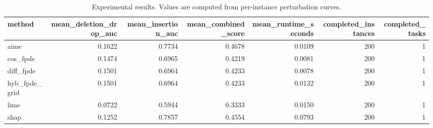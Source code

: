 \begin{table}[t]
\caption{Experimental results. Values are computed from per-instance perturbation curves.}
\label{tab:main_results_computed}
\centering
\begin{tabular}{lrrrrrr}
\toprule
method & mean\_deletion\_drop\_auc & mean\_insertion\_auc & mean\_combined\_score & mean\_runtime\_seconds & completed\_instances & completed\_tasks \\
\midrule
aime & 0.1622 & 0.7734 & 0.4678 & 0.0109 & 200 & 1 \\
cos\_fpde & 0.1474 & 0.6965 & 0.4219 & 0.0081 & 200 & 1 \\
diff\_fpde & 0.1501 & 0.6964 & 0.4233 & 0.0078 & 200 & 1 \\
hyb\_fpde\_grid & 0.1501 & 0.6964 & 0.4233 & 0.0132 & 200 & 1 \\
lime & 0.0722 & 0.5944 & 0.3333 & 0.0150 & 200 & 1 \\
shap & 0.1252 & 0.7857 & 0.4554 & 0.0793 & 200 & 1 \\
\bottomrule
\end{tabular}

\end{table}
